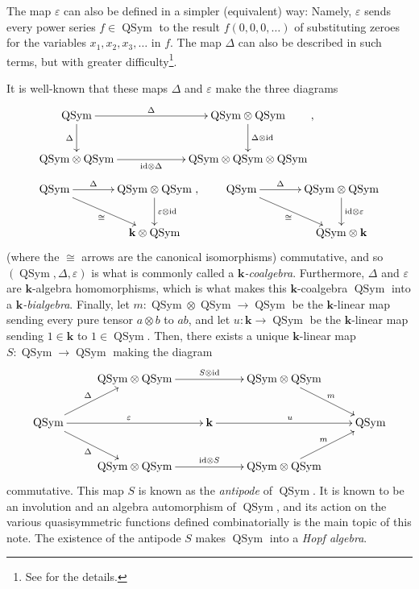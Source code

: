 \documentclass[12pt]{article}
\theoremstyle{plain}
\theoremstyle{definition}
\theoremstyle{remark}
\newcommand{\kk}{{\mathbf{k}}}
\newcommand{\id}{{\operatorname{id}}}
\newcommand{\QSym}{{\operatorname{QSym}}}
\newcommand{\bk}{{\mathbf{k}}}
\begin{document}
The map $\varepsilon$ can also be defined in a simpler
(equivalent) way: Namely, $\varepsilon$ sends every power series
$f \in \QSym$
to the result $f\left(0,0,0,\ldots\right)$ of substituting zeroes
for the variables $x_1, x_2, x_3, \ldots$ in $f$. The map $\Delta$
can also be described in such terms, but with greater
difficulty\footnote{See \cite[(5.3)]{Reiner} for the details.}.

It is well-known that these maps $\Delta$ and
$\varepsilon$ make the three diagrams
\begin{align*}
& \xymatrixcolsep{5pc}\xymatrix{
\QSym\ar[r]^-{\Delta} \ar[d]_{\Delta} & \QSym\otimes\QSym\ar[d]^{\Delta
\otimes\id} \\
\QSym\otimes\QSym\ar[r]_-{\id\otimes\Delta} & \QSym\otimes\QSym\otimes\QSym}
, \\
& \xymatrixcolsep{3pc}
\xymatrix{
\QSym\ar[dr]_{\cong} \ar[r]^-{\Delta} & \QSym\otimes\QSym\ar[d]^-{\varepsilon
\otimes\id} \\
& \bk\otimes\QSym}
,
\qquad
\xymatrixcolsep{3pc}
\xymatrix{
\QSym\ar[dr]_{\cong} \ar[r]^-{\Delta} & \QSym\otimes\QSym\ar[d]^-{\id
\otimes\varepsilon} \\
& \QSym\otimes\bk}
\end{align*}
(where the $\cong$ arrows are the canonical isomorphisms)
commutative, and so $\left(\QSym, \Delta, \varepsilon\right)$ is what
is commonly called a \textit{$\kk$-coalgebra}. Furthermore, $\Delta$
and $\varepsilon$ are $\kk$-algebra homomorphisms, which is what makes
this $\kk$-coalgebra $\QSym$ into a \textit{$\kk$-bialgebra}. Finally,
let $m : \QSym \otimes \QSym \to \QSym$ be the $\kk$-linear map sending
every pure tensor $a \otimes b$ to $ab$, and let $u : \kk \to \QSym$ be
the $\kk$-linear map sending $1 \in \kk$ to $1 \in \QSym$. Then, there
exists a unique $\kk$-linear map $S : \QSym \to \QSym$ making the
diagram
\begin{equation}
\xymatrix{
& \QSym \otimes \QSym \ar[rr]^{S \otimes \id} & & \QSym \otimes \QSym \ar[dr]^{m} & \\
\QSym \ar[ur]^{\Delta} \ar[rr]^{\varepsilon} \ar[dr]_{\Delta} & & \kk \ar[rr]^{u} & & \QSym \\
& \QSym \otimes \QSym \ar[rr]^{\id \otimes S} & & \QSym \otimes \QSym \ar[ur]^{m} & 
}
\label{eq.antipode}
\end{equation}
commutative. This map $S$ is known as the \textit{antipode} of $\QSym$.
It is known to be an involution and an algebra automorphism of $\QSym$,
and its action on the various quasisymmetric functions defined
combinatorially is the main topic of this note.
The existence of the antipode $S$ makes $\QSym$ into a
\textit{Hopf algebra}.
\end{document}
